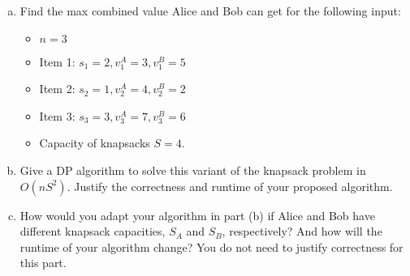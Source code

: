 \documentclass[11pt]{article}
\begin{document}
\begin{tcolorbox}[title={Problem 1 (Knapsack, Take II, 50 pts)}]
        \begin{enumerate}[(a)]
            \item Find the max combined value Alice and Bob can get for the following input:
            \begin{itemize}
                \item \( n = 3 \)
                \item Item 1: \( s_1 = 2, v_1^A = 3, v_1^B = 5 \)
                \item Item 2: \( s_2 = 1, v_2^A = 4, v_2^B = 2 \)
                \item Item 3: \( s_3 = 3, v_3^A = 7, v_3^B = 6 \)
                \item Capacity of knapsacks \(S = 4\).
            \end{itemize} 
            \item Give a DP algorithm to solve this variant of the knapsack problem in $O(nS^2)$. Justify the correctness and runtime of your proposed algorithm. 
            \item How would you adapt your algorithm in part (b) if Alice and Bob have different knapsack capacities, \(S_A\) and \(S_B\), respectively? And how will the runtime of your algorithm change? You do not need to justify correctness for this part.
        \end{enumerate}
    \end{tcolorbox}

    \newpage
\end{document}
